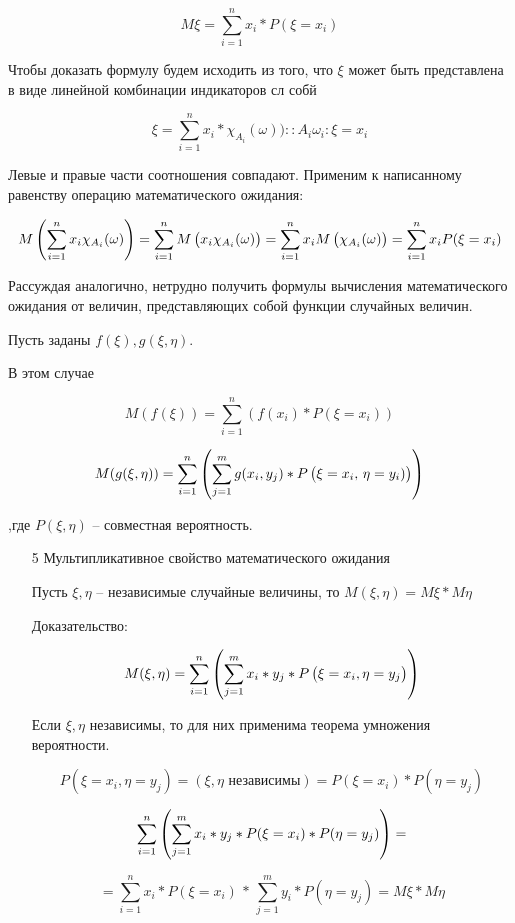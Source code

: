 \documentclass[a4paper,12pt]{report}
\begin{document}
	$$
	  M\xi=\sum^n_{i=1}x_i*P(\xi=x_i)
	$$

	Чтобы доказать формулу будем исходить из того, что $\xi$ может быть представлена в виде линейной комбинации индикаторов сл собй 

	$$
	  \xi = \sum^n_{i=1}x_i*\chi_{A_i}(\omega))
	    :: A_i{\omega_i : \xi = x_i}
	$$

	Левые и правые части соотношения совпадают. Применим к написанному равенству операцию математического ожидания: 

	$$	
	  M\left(\sum^n_{i=1}x_i\chi_{A_i}(\omega)\right) 
	    = \sum^n_{i=1}M\left(x_i\strut\chi_{A_i}(\omega)\right) 
	    = \sum^n_{i=1}x_iM\left(\strut\chi_{A_i}(\omega)\right) 
	    = \sum^n_{i=1}x_iP(\xi=x_i)	
	$$

	Рассуждая аналогично, нетрудно получить формулы вычисления математического ожидания от величин, представляющих собой функции случайных величин. 

	Пусть заданы $f(\xi),g(\xi,\eta)$.

	В этом случае 

	$$
	  M(f(\xi)) = \sum^n_{i=1}(f(x_i)*P(\xi=x_i)) 
	$$

	$$
	  M(g(\xi,\eta)) = \sum^n_{i=1}
	    \left(   
	      \sum^m_{j=1}g(x_i,y_j)*P
	        \left(
	          \xi=x_i,\strut\,\eta=y_i)
	        \right)
	    \right) 
	$$

	,где $P(\xi,\eta)$ – совместная вероятность.


	\begin{enumerate}

	\item[5] Мультипликативное свойство математического ожидания

		Пусть $\xi,\eta$ -- независимые случайные величины, то $M(\xi,\eta) =  M\xi * M\eta$

		Доказательство:

		$$
		  M(\xi,\eta) = \sum^n_{i=1}
		    \left(
		      \sum^m_{j=1}x_i*y_j*\strut P
		        \left(
		          \xi=x_i,\strut\eta=y_j
		        \right)
		    \right)
		$$

		Если $\xi,\eta$ независимы, то для них применима теорема умножения вероятности. 

		$$
		  P(\xi=x_i,\eta=y_j) 
		    = (\xi,\eta \mbox{ независимы})
		    = P(\xi=x_i)*P(\eta=y_j)
		$$
		
		$$
		  \sum^n_{i=1}
		    \left(
		      \sum^m_{j=1}x_i*y_j*\strut P(\xi=x_i)*P(\eta=y_j)
		    \right)
		  =
		$$
		
		$$
		  = \sum^n_{i=1}x_i*P(\xi=x_i)  \, * \, 
		    \sum^m_{j=1}y_i*P(\eta=y_j) 
		  = M\xi*M\eta
		$$

	\end{enumerate}
\end{document}
